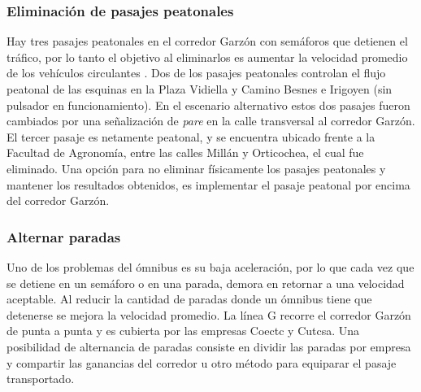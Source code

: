 \subsubsection{Eliminación de pasajes peatonales}
Hay tres pasajes peatonales en el corredor Garzón con semáforos que detienen el tráfico, por lo tanto el objetivo al eliminarlos es aumentar la velocidad promedio de los vehículos circulantes . Dos de los pasajes peatonales controlan el flujo peatonal de las esquinas en la Plaza Vidiella y Camino Besnes e Irigoyen (sin pulsador en funcionamiento). En el escenario alternativo estos dos pasajes fueron cambiados por una señalización de \emph{pare} en la calle transversal al corredor Garzón. El tercer pasaje es netamente peatonal, y se encuentra ubicado frente a la Facultad de Agronomía, entre las calles Millán y Orticochea, el cual fue eliminado. Una opción para no eliminar físicamente los pasajes peatonales y mantener los resultados obtenidos, es implementar el pasaje peatonal por encima del corredor Garzón.

\subsubsection{Alternar paradas}

Uno de los problemas del ómnibus es su baja aceleración, por lo que cada vez que se detiene en un semáforo o en una parada, demora en retornar a una velocidad aceptable. Al reducir la cantidad de paradas donde un ómnibus tiene que detenerse se mejora la velocidad promedio.
La línea G recorre el corredor Garzón de punta a punta y es cubierta por las empresas Coectc y Cutcsa. Una posibilidad de alternancia de paradas consiste en dividir las paradas por empresa y compartir las ganancias del corredor u otro método para equiparar el pasaje transportado. 

